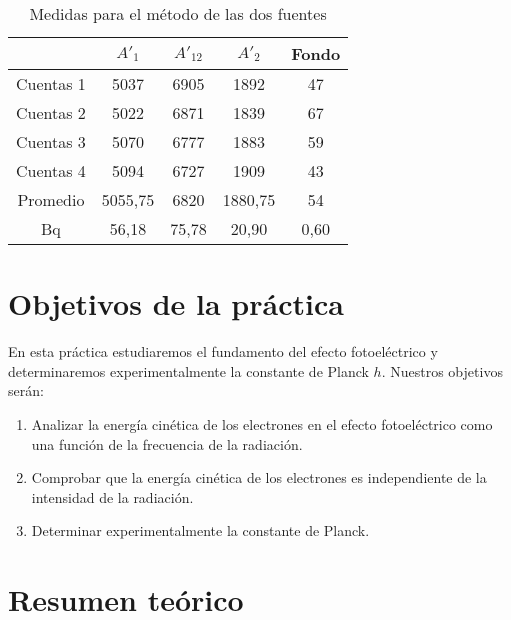 \documentclass[a4paper,12pt,spanish]{article}
\begin{document}
	\begin{table}[h!]
		\centering
		\begin{tabular}{c|c|c|c|c|}
			\cline{2-5}
			& $A'_1$  & $A'_12$ & $A'_2$  & Fondo \\ \hline
			\multicolumn{1}{|c|}{Cuentas 1} & 5037    & 6905    & 1892    & 47    \\ \hline
			\multicolumn{1}{|c|}{Cuentas 2} & 5022    & 6871    & 1839    & 67    \\ \hline
			\multicolumn{1}{|c|}{Cuentas 3} & 5070    & 6777    & 1883    & 59    \\ \hline
			\multicolumn{1}{|c|}{Cuentas 4} & 5094    & 6727    & 1909    & 43    \\ \hline\hline
			\multicolumn{1}{|c|}{Promedio}  & 5055,75 & 6820    & 1880,75 & 54    \\ \hline\hline
			\multicolumn{1}{|c|}{Bq}        & 56,18   & 75,78   & 20,90   & 0,60  \\ \hline
		\end{tabular}
		\caption{Medidas para el método de las dos fuentes}
		\label{tab:my-table}
	\end{table}
	
	
	
	
	
	
	\section{Objetivos de la práctica}
	
	En esta práctica estudiaremos el fundamento del efecto fotoeléctrico y determinaremos experimentalmente la constante de Planck $h$. Nuestros objetivos serán:
	
	\begin{enumerate}
		\item Analizar la energía cinética de los electrones en el efecto fotoeléctrico como una función de la frecuencia de la radiación.
		\item Comprobar que la energía cinética de los electrones es independiente de la intensidad de la radiación.
		\item Determinar experimentalmente la constante de Planck.
	\end{enumerate}
	
	
	
	\section{Resumen teórico}
	
\end{document}
